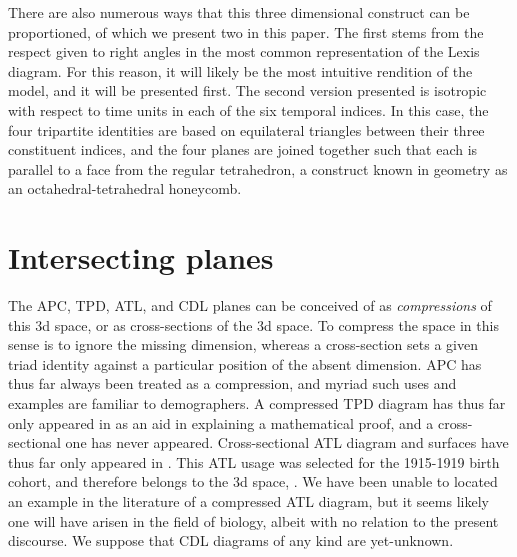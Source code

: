 \documentclass[11pt,oneside,a4paper]{article} %
\newcommand\eg[1]{\textcolor{bl}{#1}}
\begin{document}
There are also
numerous ways that this three dimensional construct can be proportioned, of
which we present two in this paper. The first stems from the respect given to
right angles in the most common representation of the Lexis diagram. For this reason, it will likely be
the most intuitive rendition of the model, and it will be presented first. The
second version presented is isotropic with respect to time units in each of the
six temporal indices. In this case, the four tripartite identities are based on
equilateral triangles between their three constituent indices, and the four
planes are joined together such that each is parallel to a face from the regular
tetrahedron, a construct known in geometry as an octahedral-tetrahedral
honeycomb.

\section*{Intersecting planes}

The \eg{APC}, \eg{TPD}, \eg{ATL}, and \eg{CDL} planes can be conceived of as
\textit{compressions} of this 3d space, or as cross-sections of the 3d space. To
compress the space in this sense is to ignore the missing dimension,
whereas a cross-section sets a given triad identity against a particular
position of the absent dimension. \eg{APC} has thus far always been treated as a
compression, and myriad such uses and examples are familiar to demographers.
A compressed \eg{TPD} diagram has thus far only appeared in \citet{pancho2015}
as an aid in explaining a mathematical proof, and a cross-sectional one has
never appeared.
Cross-sectional \eg{ATL} diagram and surfaces have thus far only appeared in
\citet{riffe2015ttd}. This \eg{ATL} usage was selected for the 1915-1919 birth
cohort, and therefore belongs to the 3d
space,
.
We have been unable to located an example in the literature of a compressed
\eg{ATL} diagram, but it seems likely one will have arisen in the field of
biology, albeit with no relation to the present discourse. We suppose
that \eg{CDL} diagrams of any kind are yet-unknown.
\end{document}
